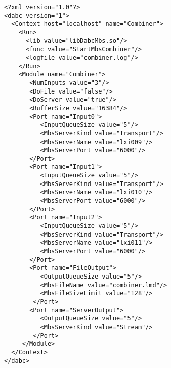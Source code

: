 \begin{small}
\begin{verbatim}
<?xml version="1.0"?>
<dabc version="1">
  <Context host="localhost" name="Combiner">
    <Run>
      <lib value="libDabcMbs.so"/>
      <func value="StartMbsCombiner"/>
      <logfile value="combiner.log"/>
    </Run>
    <Module name="Combiner">
       <NumInputs value="3"/>
       <DoFile value="false"/>
       <DoServer value="true"/>
       <BufferSize value="16384"/>
       <Port name="Input0">
          <InputQueueSize value="5"/>
          <MbsServerKind value="Transport"/>
          <MbsServerName value="lxi009"/>
          <MbsServerPort value="6000"/>
       </Port>
       <Port name="Input1">
          <InputQueueSize value="5"/>
          <MbsServerKind value="Transport"/>
          <MbsServerName value="lxi010"/>
          <MbsServerPort value="6000"/>
       </Port>
       <Port name="Input2">
          <InputQueueSize value="5"/>
          <MbsServerKind value="Transport"/>
          <MbsServerName value="lxi011"/>
          <MbsServerPort value="6000"/>
       </Port>
       <Port name="FileOutput">
          <OutputQueueSize value="5"/>
          <MbsFileName value="combiner.lmd"/>
          <MbsFileSizeLimit value="128"/>
        </Port>
       <Port name="ServerOutput">
          <OutputQueueSize value="5"/>
          <MbsServerKind value="Stream"/>
        </Port>
     </Module>
  </Context>
</dabc>
\end{verbatim}
\end{small}



